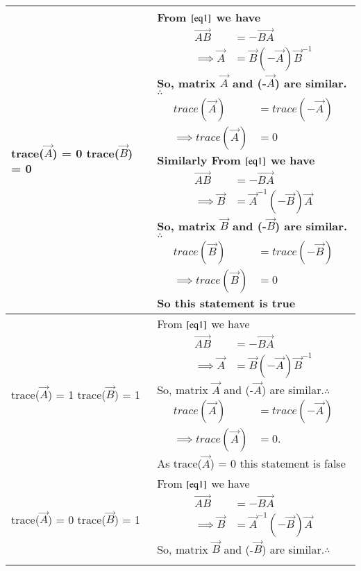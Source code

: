 \documentclass[journal,12pt,twocolumn]{IEEEtran}
\begin{document}
\begin{table}[h!]
\begin{center}
\begin{tabular}{|m{2.2cm}|m{6.3cm}|}\hline
        trace($\vec{A}$) = 0 trace($\vec{B}$) = 0 & From $\eqref{eq1}$ we have {\begin{align*}
            \vec{AB} &= -\vec{BA}\\
            \implies\vec{A} &= \vec{B}(-\vec{A})\vec{B}^{-1}
        \end{align*}}So, matrix $\vec{A}$ and (-$\vec{A}$) are similar.$\therefore$ {\begin{align*}
            trace(\vec{A}) &= trace(-\vec{A})\\
            \implies trace(\vec{A}) &= 0
        \end{align*}}Similarly From $\eqref{eq1}$ we have {\begin{align*}
            \vec{AB} &= -\vec{BA}\\
            \implies\vec{B} &= \vec{A}^{-1}(-\vec{B})\vec{A}
        \end{align*}}So, matrix $\vec{B}$ and (-$\vec{B}$) are similar.$\therefore$ {\begin{align*}
            trace(\vec{B}) &= trace(-\vec{B})\\
            \implies trace(\vec{B}) &= 0
        \end{align*}} So this statement is true \\
        \hline
        trace($\vec{A}$) = 1 trace($\vec{B}$) = 1 & From $\eqref{eq1}$ we have {\begin{align*}
            \vec{AB} &= -\vec{BA}\\
            \implies\vec{A} &= \vec{B}(-\vec{A})\vec{B}^{-1}
        \end{align*}}So, matrix $\vec{A}$ and (-$\vec{A}$) are similar.$\therefore$ {\begin{align*}
            trace(\vec{A}) &= trace(-\vec{A})\\
            \implies trace(\vec{A}) &= 0.
            \end{align*}} As trace($\vec{A}$) = 0 this statement is false\\
        \hline
        trace($\vec{A}$) = 0 trace($\vec{B}$) = 1 & From $\eqref{eq1}$ we have {\begin{align*}
            \vec{AB} &= -\vec{BA}\\
            \implies\vec{B} &= \vec{A}^{-1}(-\vec{B})\vec{A}
        \end{align*}}So, matrix $\vec{B}$ and (-$\vec{B}$) are similar.$\therefore$ {\begin{align*}

\end{align*}}
\end{tabular}
\end{center}
\end{table}
\end{document}
